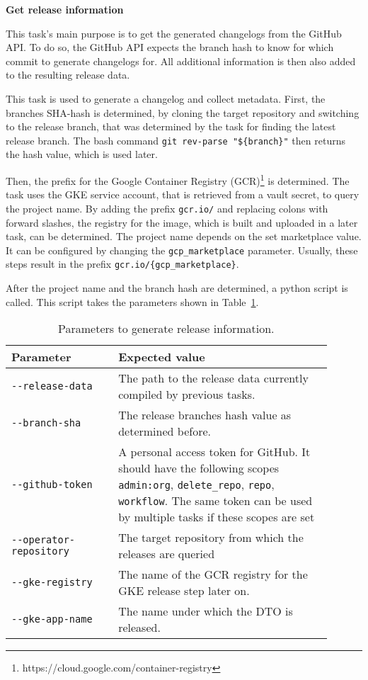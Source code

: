 \textbf{Get release information}

This task's main purpose is to get the generated changelogs from the GitHub API.
To do so, the GitHub API expects the branch hash to know for which commit to generate changelogs for.
All additional information is then also added to the resulting release data.

This task is used to generate a changelog and collect metadata.
First, the branches SHA-hash is determined, by cloning the target repository and switching to the release branch, that was determined by the task for finding the latest release branch.
The bash command \verb|git rev-parse "${branch}"| then returns the hash value, which is used later.

Then, the prefix for the Google Container Registry (GCR)\footnote{https://cloud.google.com/container-registry} is determined.
The task uses the GKE service account, that is retrieved from a vault secret, to query the project name.
By adding the prefix \verb|gcr.io/| and replacing colons with forward slashes, the registry for the image, which is built and uploaded in a later task, can be determined.
The project name depends on the set marketplace value.
It can be configured by changing the \verb|gcp_marketplace| parameter.
Usually, these steps result in the prefix \verb|gcr.io/{gcp_marketplace}|.

After the project name and the branch hash are determined, a python script is called.
This script takes the parameters shown in Table~\ref{tab:params-to-generate-release-information}.

\begin{table}[h]
    \centering
    \caption{Parameters to generate release information.}
    \label{tab:params-to-generate-release-information}
    \begin{tabular}{p{0.3\linewidth}|p{0.6\linewidth}}
        Parameter & Expected value \\
        \hline
        \verb|--release-data| & The path to the release data currently compiled by previous tasks.  \\
        \verb|--branch-sha| & The release branches hash value as determined before. \\
        \verb|--github-token| & A personal access token for GitHub.
            It should have the following scopes \verb|admin:org|, \verb|delete_repo|, \verb|repo|, \verb|workflow|.
            The same token can be used by multiple tasks if these scopes are set \\
        \verb|--operator-repository| & The target repository from which the releases are queried \\
        \verb|--gke-registry| & The name of the GCR registry for the GKE release step later on. \\
        \verb|--gke-app-name| & The name under which the DTO is released. \\
    \end{tabular}
\end{table}

